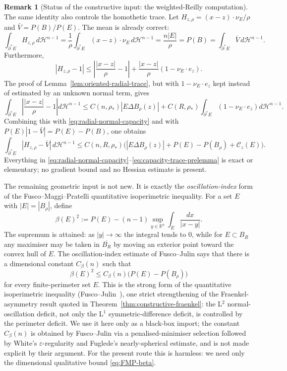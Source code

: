 \documentclass[11pt]{amsart}
\theoremstyle{definition}
\newtheorem{remark}[theorem]{Remark}
\newcommand{\R}{\mathbb R}
\newcommand{\rstar}{\rho_*}
\newcommand{\Hn}{\mathcal H^{n-1}}
\begin{document}
\begin{remark}[Status of the constructive input: the weighted-Reilly computation]
The same identity also controls the homothetic trace.  Let
\(H_{z,\rho}=(x-z)\cdot\nu_E/\rho\) and
\(\bar V=P(B)/P(E)\).  The mean is already correct:
\[
   \int_{\partial^*E}H_{z,\rho}\,d\Hn
   =\frac1\rho\int_{\partial^*E}(x-z)\cdot\nu_E\,d\Hn
   =\frac{n|E|}{\rho}=P(B)
   =\int_{\partial^*E}\bar V\,d\Hn .
\]
Furthermore,
\[
   |H_{z,\rho}-1|
   \le \left|\frac{|x-z|}{\rho}-1\right|
       +\frac{|x-z|}{\rho}(1-\nu_E\cdot e_z).
\]
The proof of Lemma~\ref{lem:oriented-radial-trace}, but with
\(1-\nu_E\cdot e_z\) kept instead of estimated by an unknown normal term, gives
\[
   \int_{\partial^*E}\left|\frac{|x-z|}{\rho}-1\right|d\Hn
   \le C(n,\rstar)|E\Delta B_\rho(z)|
      +C(R,\rstar)\int_{\partial^*E}(1-\nu_E\cdot e_z)d\Hn .
\]
Combining this with \eqref{eq:radial-normal-capacity} and with
\(P(E)|1-\bar V|=P(E)-P(B)\), one obtains
\begin{equation}\label{eq:capacity-trace-prelemma}
   \int_{\partial^*E}|H_{z,\rho}-\bar V|\,d\Hn
   \le C(n,R,\rstar)
      \bigl(|E\Delta B_\rho(z)|+P(E)-P(B_\rho)+\mathcal C_z(E)\bigr).
\end{equation}
Everything in \eqref{eq:radial-normal-capacity}--\eqref{eq:capacity-trace-prelemma}
is exact or elementary; no gradient bound and no Hessian estimate is present.

The remaining geometric input is not new.  It is exactly the
\emph{oscillation-index} form of the Fusco--Maggi--Pratelli quantitative
isoperimetric inequality.  For a set \(E\) with \(|E|=|B_\rho|\), define
\[
   \beta(E)^2
   :=P(E)-(n-1)\sup_{y\in\R^n}\int_E\frac{dx}{|x-y|} .
\]
The supremum is attained: as \(|y|\to\infty\) the integral tends to \(0\), while
for \(E\subset B_R\) any maximiser may be taken in \(\overline{B_R}\) by moving
an exterior point toward the convex hull of \(E\).  The oscillation-index
estimate of Fusco--Julin \cite{FJ2014} says that there is a dimensional
constant \(C_\beta(n)\) such that
\begin{equation}\label{eq:FMP-beta}
   \beta(E)^2\le C_\beta(n)\bigl(P(E)-P(B_\rho)\bigr)
\end{equation}
for every finite-perimeter set \(E\).  This is the strong form of the
quantitative isoperimetric inequality (Fusco--Julin~\cite[Thm.~1.1 and
Prop.~1.2]{FJ2014}), one strict strengthening of the
Fraenkel-asymmetry result quoted in Theorem~\ref{thm:constructive-fraenkel}:
the L\(^2\) normal-oscillation deficit, not only the L\(^1\) symmetric-difference
deficit, is controlled by the perimeter deficit.  We use it here only as a
black-box import; the constant \(C_\beta(n)\) is obtained by Fusco--Julin via a
penalised-minimiser selection followed by White's \(\varepsilon\)-regularity and
Fuglede's nearly-spherical estimate, and is not made explicit by their argument.
For the present route this is harmless: we need only the dimensional
qualitative bound \eqref{eq:FMP-beta}.


\end{remark}
\end{document}
